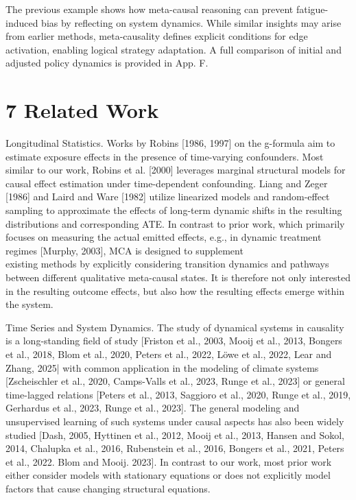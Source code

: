 \documentclass[10pt]{article}
\begin{document}
The previous example shows how meta-causal reasoning can prevent fatigue-induced bias by reflecting on system dynamics. While similar insights may arise from earlier methods, meta-causality defines explicit conditions for edge activation, enabling logical strategy adaptation. A full comparison of initial and adjusted policy dynamics is provided in App. F.

\section*{7 Related Work}
Longitudinal Statistics. Works by Robins [1986, 1997] on the g-formula aim to estimate exposure effects in the presence of time-varying confounders. Most similar to our work, Robins et al. [2000] leverages marginal structural models for causal effect estimation under time-dependent confounding. Liang and Zeger [1986] and Laird and Ware [1982] utilize linearized models and random-effect sampling to approximate the effects of long-term dynamic shifts in the resulting distributions and corresponding ATE. In contrast to prior work, which primarily focuses on measuring the actual emitted effects, e.g., in dynamic treatment regimes [Murphy, 2003], MCA is designed to supplement\\
existing methods by explicitly considering transition dynamics and pathways between different qualitative meta-causal states. It is therefore not only interested in the resulting outcome effects, but also how the resulting effects emerge within the system.

Time Series and System Dynamics. The study of dynamical systems in causality is a long-standing field of study [Friston et al., 2003, Mooij et al., 2013, Bongers et al., 2018, Blom et al., 2020, Peters et al., 2022, Löwe et al., 2022, Lear and Zhang, 2025| with common application in the modeling of climate systems [Zscheischler et al., 2020, Camps-Valls et al., 2023, Runge et al., 2023] or general time-lagged relations [Peters et al., 2013, Saggioro et al., 2020, Runge et al., 2019, Gerhardus et al., 2023, Runge et al., 2023]. The general modeling and unsupervised learning of such systems under causal aspects has also been widely studied [Dash, 2005, Hyttinen et al., 2012, Mooij et al., 2013, Hansen and Sokol, 2014, Chalupka et al., 2016, Rubenstein et al., 2016, Bongers et al., 2021, Peters et al., 2022. Blom and Mooij. 2023]. In contrast to our work, most prior work either consider models with stationary equations or does not explicitly model factors that cause changing structural equations.
\end{document}
